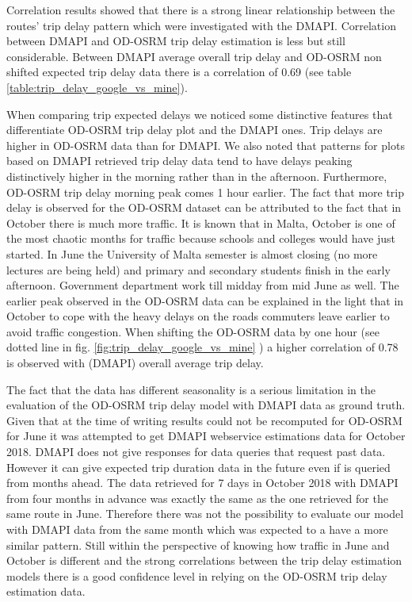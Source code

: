 \documentclass[12pt, a4paper]{report}
\theoremstyle{definition}
\theoremstyle{definition}%
\theoremstyle{definition}%
\theoremstyle{definition}%
\theoremstyle{definition}%
\theoremstyle{definition}%
\begin{document}
Correlation results showed that there is a strong linear relationship between the routes' trip delay pattern which were investigated with the DMAPI. Correlation between DMAPI and OD-OSRM trip delay estimation is less but still considerable. Between DMAPI average overall trip delay and OD-OSRM non shifted expected trip delay data there is a correlation of 0.69 (see table \ref{table:trip_delay_google_vs_mine}).

When comparing trip expected delays we noticed some distinctive features that differentiate OD-OSRM trip delay plot and the DMAPI ones. Trip delays are higher in OD-OSRM data than for DMAPI. We also noted that patterns for plots based on DMAPI retrieved trip delay data tend to have delays peaking distinctively higher in the morning rather than in the afternoon. Furthermore, OD-OSRM trip delay morning peak comes 1 hour earlier. The fact that more trip delay is observed for the OD-OSRM dataset can be attributed to the fact that in October there is much more traffic. It is known that in Malta, October is one of the most chaotic months for traffic because schools and colleges would have just started. In June the University of Malta semester is almost closing (no more lectures are being held) and primary and secondary students finish in the early afternoon. Government department work till midday from mid June as well. The earlier peak observed in the OD-OSRM data can be explained in the light that in October to cope with the heavy delays on the roads commuters leave earlier to avoid traffic congestion. When shifting the OD-OSRM data by one hour (see dotted line in fig. \ref{fig:trip_delay_google_vs_mine} ) a higher correlation of 0.78 is observed with (DMAPI) overall average trip delay.

The fact that the data has different seasonality is a serious limitation in the evaluation of the OD-OSRM trip delay model with DMAPI data as ground truth. Given that at the time of writing results could not be recomputed for OD-OSRM for June it was attempted to get DMAPI webservice estimations data for October 2018. DMAPI does not give responses for data queries that request past data. However it can give expected trip duration data in the future even if is queried from months ahead. The data retrieved for 7 days in October 2018 with DMAPI from four months in advance was exactly the same as the one retrieved for the same route in June. Therefore there was not the possibility to evaluate our model with DMAPI data from the same month which was expected to a have a more similar pattern. Still within the perspective of knowing how traffic in June and October is different and the strong correlations between the trip delay estimation models there is a good confidence level in relying on the OD-OSRM trip delay estimation data.	
\end{document}
